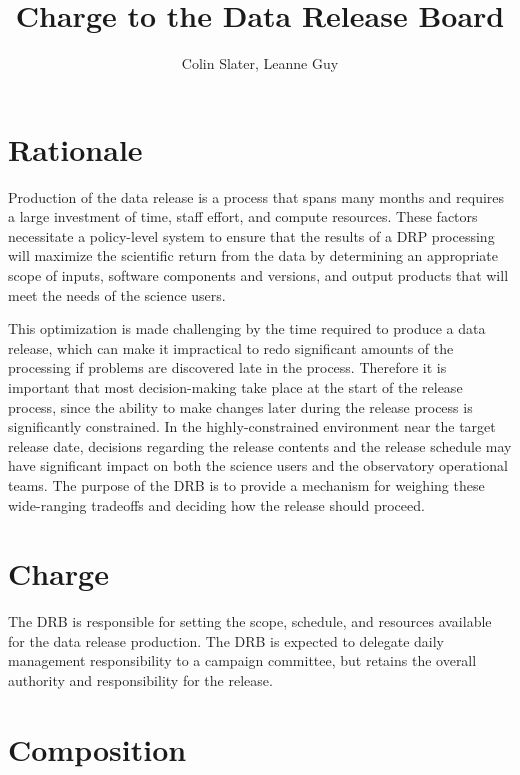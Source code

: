 \documentclass[OPS,authoryear,toc,lsstdraft]{lsstdoc}
\title{Charge to the Data Release Board}
\author{%
Colin Slater, Leanne Guy
}
\date{\vcsDate}
\begin{document}
\maketitle



\section{Rationale}

Production of the data release is a process that spans many months and requires a large investment
of time, staff effort, and compute resources. These factors necessitate a policy-level system to
ensure that the results of a DRP processing will maximize the scientific return from the data by
determining an appropriate scope of inputs, software components and versions, and output products
that will meet the needs of the science users.

This optimization is made challenging by the time required to produce a data release, which can make
it impractical to redo significant amounts of the processing if problems are discovered late in the
process. Therefore it is important that most decision-making take place at the start of the release
process, since the ability to make changes later during the release process is significantly
constrained. In the highly-constrained environment near the target release date, decisions regarding
the release contents and the release schedule may have significant impact on both the science users
and the observatory operational teams. The purpose of the DRB is to provide a mechanism for weighing
these wide-ranging tradeoffs and deciding how the release should proceed.

\section{Charge}

The DRB is responsible for setting the scope, schedule, and resources available for the data release
production. The DRB is expected to delegate daily management responsibility to a campaign committee,
but retains the overall authority and responsibility for the release.

\section{Composition}
\end{document}
